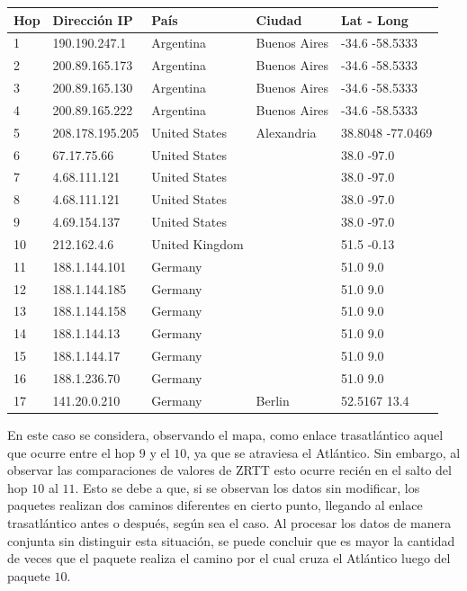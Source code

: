 \begin{center}
 \begin{tabular}{|l|l|l|l|l|}
    \hline
    Hop &Dirección IP &País &Ciudad &Lat - Long \\ \hline \hline
    1 & 190.190.247.1 & Argentina & Buenos Aires & -34.6 -58.5333	\\ \hline
    2 & 200.89.165.173 & Argentina & Buenos Aires & -34.6 -58.5333	\\ \hline
    3 & 200.89.165.130 & Argentina & Buenos Aires & -34.6 -58.5333	\\ \hline
    4 & 200.89.165.222 & Argentina & Buenos Aires & -34.6 -58.5333	\\ \hline
    5 & 208.178.195.205 & United States & Alexandria & 38.8048 -77.0469 \\ \hline
    6 & 67.17.75.66 & United States &  & 38.0 -97.0 \\ \hline
    7 & 4.68.111.121 & United States & & 38.0 -97.0 \\ \hline
    8 & 4.68.111.121 & United States & & 38.0 -97.0 \\ \hline
    9 & 4.69.154.137 & United States & & 38.0 -97.0 \\ \hline
    10 & 212.162.4.6 & United Kingdom & &  51.5 -0.13 \\ \hline
    11 & 188.1.144.101 & Germany &  & 51.0 9.0 \\ \hline
    12 & 188.1.144.185 & Germany &  & 51.0 9.0 \\ \hline
    13 & 188.1.144.158 & Germany &  & 51.0 9.0 \\ \hline
    14 & 188.1.144.13 & Germany &  & 51.0 9.0 \\ \hline
    15 & 188.1.144.17 & Germany &  & 51.0 9.0 \\ \hline
    16 & 188.1.236.70 & Germany &  & 51.0 9.0 \\ \hline
    17 & 141.20.0.210 & Germany & Berlin & 52.5167 13.4 \\ \hline
 \end{tabular}
\end{center}

En este caso se considera, observando el mapa, como enlace trasatlántico aquel que ocurre entre el hop $9$ y el $10$, ya que se atraviesa el Atlántico. Sin embargo, al observar las comparaciones de valores de ZRTT esto ocurre recién en el salto del hop $10$ al $11$. Esto se debe a que, si se observan los datos sin modificar, los paquetes realizan dos caminos diferentes en cierto punto, llegando al enlace trasatlántico antes o después, según sea el caso. Al procesar los datos de manera conjunta sin distinguir esta situación, se puede concluir que es mayor la cantidad de veces que el paquete realiza el camino por el cual cruza el Atlántico luego del paquete $10$. 


